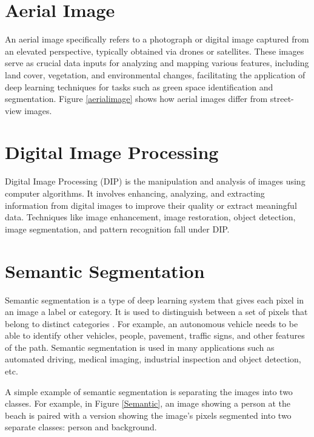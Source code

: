 \section{Aerial Image}
An aerial image specifically refers to a photograph or digital image captured from an elevated perspective, typically obtained via drones or satellites. These images serve as crucial data inputs for analyzing and mapping various features, including land cover, vegetation, and environmental changes, facilitating the application of deep learning techniques for tasks such as green space identification and segmentation. Figure \ref{aerialimage} shows how aerial images differ from street-view images.

\section{Digital Image Processing}
Digital Image Processing (DIP) is the manipulation and analysis of images using computer algorithms. It involves enhancing, analyzing, and extracting information from digital images to improve their quality or extract meaningful data. Techniques like image enhancement, image restoration, object detection, image segmentation, and pattern recognition fall under DIP. 
\section{Semantic Segmentation}

Semantic segmentation is a type of deep learning system that gives each pixel in an image a label or category. It is used to distinguish between a set of pixels that belong to distinct categories . For example, an autonomous vehicle needs to be able to identify other vehicles, people, pavement, traffic signs, and other features of the path. Semantic segmentation is used in many applications such as automated driving, medical imaging, industrial inspection and object detection, etc.

A simple example of semantic segmentation is separating the images into two classes. For example, in Figure \ref{Semantic}, an image showing a person at the beach is paired with a version showing the image's pixels segmented into two separate classes: person and background.



